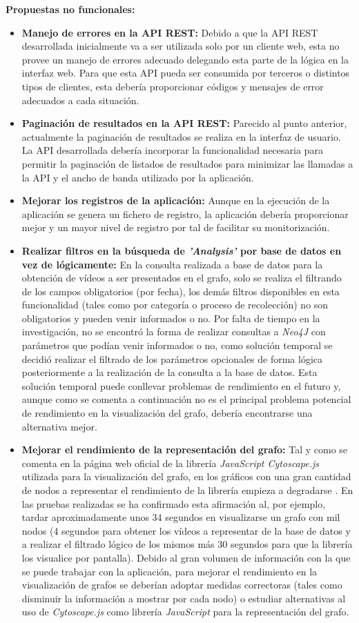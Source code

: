 \documentclass[11pt,a4paper]{article}
\begin{document}
\noindent\textbf{Propuestas no funcionales:}
\begin{itemize}
\item \textbf{Manejo de errores en la API REST:} Debido a que la API REST desarrollada inicialmente va a ser utilizada solo por un cliente web, esta no provee un manejo de errores adecuado delegando esta parte de la lógica en la interfaz web. Para que esta API pueda ser consumida por terceros o distintos tipos de clientes, esta debería proporcionar códigos y mensajes de error adecuados a cada situación.
\item \textbf{Paginación de resultados en la API REST:} Parecido al punto anterior, actualmente la paginación de resultados se realiza en la interfaz de usuario. La API desarrollada debería incorporar la funcionalidad necesaria para permitir la paginación de listados de resultados para minimizar las llamadas a la API y el ancho de banda utilizado por la aplicación.
\item \textbf{Mejorar los registros de la aplicación:} Aunque en la ejecución de la aplicación se genera un fichero de registro, la aplicación debería proporcionar mejor y un mayor nivel de registro por tal de facilitar su monitorización.
\item \textbf{Realizar filtros en la búsqueda de \textit{'Analysis'} por base de datos en vez de lógicamente:} En la consulta realizada a base de datos para la obtención de vídeos a ser presentados en el grafo, solo se realiza el filtrando de los campos obligatorios (por fecha), los demás filtros disponibles en esta funcionalidad (tales como por categoría o proceso de recolección) no son obligatorios y pueden venir informados o no. Por falta de tiempo en la investigación, no se encontró la forma de realizar consultas a \textit{Neo4J} con parámetros que podían venir informados o no, como solución temporal se decidió realizar el filtrado de los parámetros opcionales de forma lógica posteriormente a la realización de la consulta a la base de datos. Esta solución temporal puede conllevar problemas de rendimiento en el futuro y, aunque como se comenta a continuación no es el principal problema potencial de rendimiento en la visualización del grafo,  debería encontrarse una alternativa mejor. 
\item \textbf{Mejorar el rendimiento de la representación del grafo:} Tal y como se comenta en la página web oficial de la librería \textit{JavaScript Cytoscape.js} utilizada para la visualización del grafo, en los gráficos con una gran cantidad de nodos a representar el rendimiento de la librería empieza a degradarse  \cite{28}. En las pruebas realizadas se ha confirmado esta afirmación al, por ejemplo, tardar aproximadamente unos 34 segundos en visualizarse un grafo con mil nodos (4 segundos para obtener los vídeos a representar de la base de datos y a realizar el filtrado lógico de los mismos más 30 segundos para que la librería los visualice por pantalla). Debido al gran volumen de información con la que se puede trabajar con la aplicación, para mejorar el rendimiento en la visualización de grafos se deberían adoptar medidas correctoras (tales como disminuir la información a mostrar por cada nodo) o estudiar alternativas al uso de \textit{Cytoscape.js} como librería \textit{JavaScript} para la representación del grafo.

\end{itemize}
\end{document}
